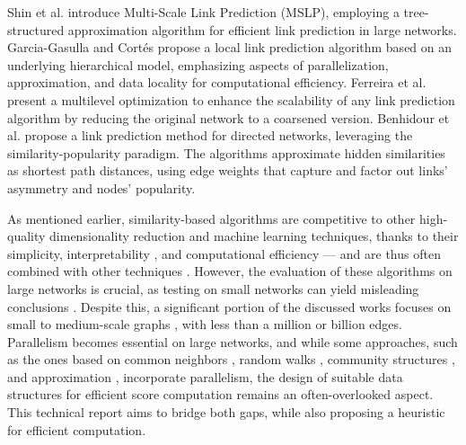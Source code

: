 Shin et al. \cite{shin2012multi} introduce Multi-Scale Link Prediction (MSLP), employing a tree-structured approximation algorithm for efficient link prediction in large networks. Garcia-Gasulla and Cort{\'e}s \cite{garcia2014link} propose a local link prediction algorithm based on an underlying hierarchical model, emphasizing aspects of parallelization, approximation, and data locality for computational efficiency. Ferreira et al. \cite{ferreira2019scalability} present a multilevel optimization to enhance the scalability of any link prediction algorithm by reducing the original network to a coarsened version. Benhidour et al. \cite{benhidour2022approach} propose a link prediction method for directed networks, leveraging the similarity-popularity paradigm. The algorithms approximate hidden similarities as shortest path distances, using edge weights that capture and factor out links' asymmetry and nodes' popularity.


As mentioned earlier, similarity-based algorithms are competitive to other high-quality dimensionality reduction and machine learning techniques, thanks to their simplicity, interpretability \cite{pai2019netdx, barbieri2014follow}, and computational efficiency \cite{garcia2014link} --- and are thus often combined with other techniques \cite{kumari2022supervised, abuoda2020link, pai2019netdx}. However, the evaluation of these algorithms on large networks is crucial, as testing on small networks can yield misleading conclusions \cite{zhou2021progresses, zhou2021experimental}. Despite this, a significant portion of the discussed works focuses on small \cite{guo2019node, rafiee2020cndp, mumin2022efficient, papadimitriou2012fast, vega2021link, saifi2023fast, ferreira2019scalability, benhidour2022approach} to medium-scale graphs \cite{yang2015new, cui2016bounded, kalkanfinding, mohan2017scalable, wang2019link, bastami2019gravitation, shin2012multi, garcia2014link}, with less than a million or billion edges. Parallelism becomes essential on large networks, and while some approaches, such as the ones based on common neighbors \cite{yang2015new, cui2016bounded}, random walks \cite{papadimitriou2012fast}, community structures \cite{mohan2017scalable, wang2019link}, and approximation \cite{garcia2014link}, incorporate parallelism, the design of suitable data structures for efficient score computation remains an often-overlooked aspect. This technical report aims to bridge both gaps, while also proposing a heuristic for efficient computation.
